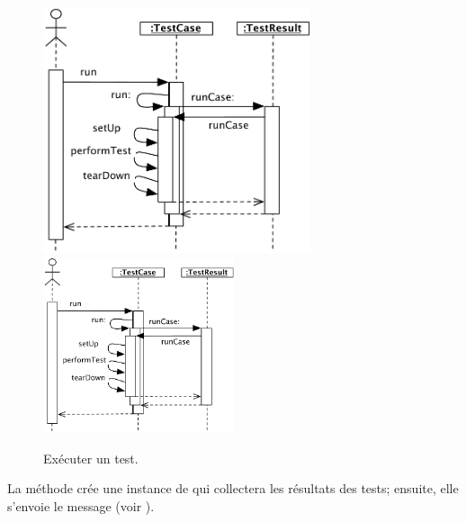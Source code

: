 \documentclass[a4paper,10pt,twoside]{book}
\begin{document}
\begin{figure}[tbh]
  \begin{center}
  	\ifluluelse
		{\includegraphics[width=0.7\textwidth]{sunit-scenario}}
		{\includegraphics[width=0.5\textwidth]{sunit-scenario}}
	\caption{Exécuter un test.}
	\label{fig:sunit-scenario}
  \end{center}
\end{figure}

La méthode  crée une instance de  qui collectera les résultats des tests; ensuite, elle s'envoie le message 
(voir ).
\end{document}
